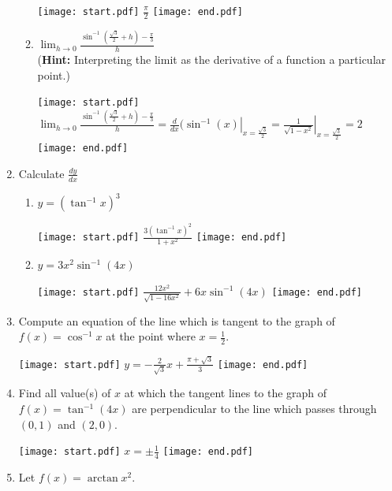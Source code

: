 \documentclass[12pt]{article}
\begin{document}
\begin{enumerate}
\begin{enumerate}
\texttt{[image: start.pdf]}
{{$\displaystyle \frac{\pi}{2}$}}
\texttt{[image: end.pdf]}


\item $\lim_{h \rightarrow 0}{\frac{\sin^{-1}{\left(\frac{\sqrt{3}}{2}+h\right)}-\frac{\pi}{3}}{h}}$ \\({\bf Hint:} Interpreting the limit as the derivative of a function a particular point.)

\texttt{[image: start.pdf]}
{{$\lim_{h \rightarrow 0}{\frac{\sin^{-1}{\left(\frac{\sqrt{3}}{2}+h\right)}-\frac{\pi}{3}}{h}}=\left.\frac{d}{dx}(\sin^{-1}{(x)}\right|_{x=\frac{\sqrt{3}}{2}}=\left.\frac{1}{\sqrt{1-x^2}}\right|_{x=\frac{\sqrt{3}}{2}}=2$}}
\texttt{[image: end.pdf]}


\end{enumerate}

\item Calculate $\frac{dy}{dx}$

\begin{enumerate}

\item $y=\left(\tan^{-1}x\right)^3$

\texttt{[image: start.pdf]}
{$\frac{3\left(\tan^{-1}x\right)^2}{1+x^2}$}
\texttt{[image: end.pdf]}


\item $y=3x^2\sin^{-1}(4x)$

\texttt{[image: start.pdf]}
{$\frac{12x^2}{\sqrt{1-16x^2}}+6x\sin^{-1}(4x)$}
\texttt{[image: end.pdf]}


\end{enumerate}

\item Compute an equation of the line which is tangent to the graph of $f(x)=\cos^{-1}{x}$ at the point where $x=\frac{1}{2}$.

\texttt{[image: start.pdf]}
{{$y=-\frac{2}{\sqrt{3}}x+\frac{\pi+\sqrt{3}}{3}$}}
\texttt{[image: end.pdf]}


\item Find all value(s) of $x$ at which the tangent lines to the graph of $f(x)=\tan^{-1}{(4x)}$ are perpendicular to the line which passes through $(0,1)$ and $(2,0)$.

\texttt{[image: start.pdf]}
{{$x=\pm\frac{1}{4}$}}
\texttt{[image: end.pdf]}


\item Let $f(x)=\arctan{x^2}$.

\begin{enumerate}


\end{enumerate}
\end{enumerate}
\end{document}
